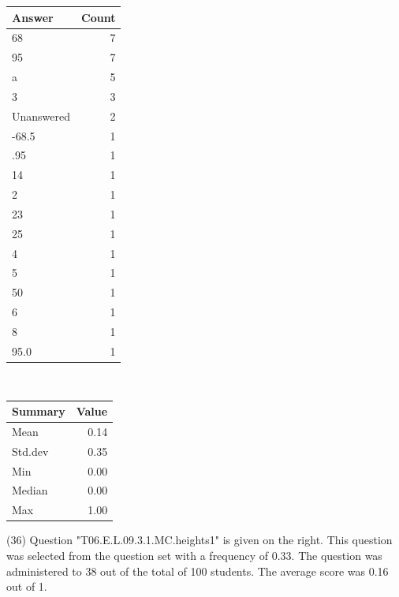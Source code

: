 \documentclass[12pt,nohyper]{tufte-handout}\usepackage[]{graphicx}\usepackage[]{color}
\begin{document}
\begin{center}%
\begin{tabular}{lr}
  \hline
Answer & Count \\ 
  \hline
68 &   7 \\ 
  95 &   7 \\ 
  a &   5 \\ 
  3 &   3 \\ 
  Unanswered &   2 \\ 
  -68.5 &   1 \\ 
  .95 &   1 \\ 
  14 &   1 \\ 
  2 &   1 \\ 
  23 &   1 \\ 
  25 &   1 \\ 
  4 &   1 \\ 
  5 &   1 \\ 
  50 &   1 \\ 
  6 &   1 \\ 
  8 &   1 \\ 
  95.0 &   1 \\ 
   \hline
\end{tabular}
~~~~~~~~%
\begin{tabular}{lr}
  \hline
Summary & Value \\ 
  \hline
Mean & 0.14 \\ 
  Std.dev & 0.35 \\ 
  Min & 0.00 \\ 
  Median & 0.00 \\ 
  Max & 1.00 \\ 
   \hline
\end{tabular}
\end{center}\newpage{} (36) Question "T06.E.L.09.3.1.MC.heights1" is given on the right. This question was selected from the question set with a frequency of 0.33. The question was administered to 38 out of the total of 100 students. The average score was 0.16 out of 1.
\end{document}
